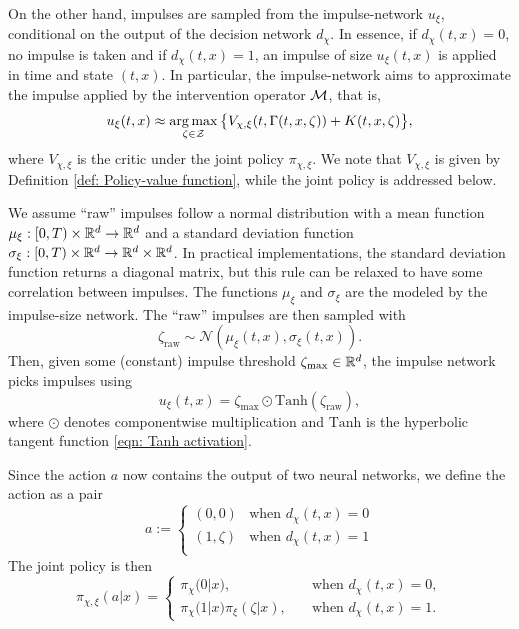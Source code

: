 On the other hand, impulses are sampled from the impulse-network $u_\xi$, conditional on the output of the decision network $d_\chi$. In essence, if $d_\chi(t,x) = 0$, no impulse is taken and if $d_\chi(t,x)=1$, an impulse of size $u_\xi(t,x)$ is applied in time and state $(t,x)$. In particular, the impulse-network aims to approximate the impulse applied by the intervention operator $\mathcal{M}$, that is, 
\begin{equation*}
    u_\xi(t,x) \approx \operatorname*{arg\,max}_{\zeta \in \mathcal{Z}} \big\{ V_{\chi, \xi}(t,\Gamma(t,x,\zeta)) + K(t,x,\zeta) \big\},
\end{equation*}
where $V_{\chi, \xi}$ is the critic under the joint policy $\pi_{\chi, \xi}$. We note that $V_{\chi, \xi}$ is given by Definition \ref{def: Policy-value function}, while the joint policy is addressed below. 

We assume ``raw'' impulses follow a normal distribution with a mean function $\mu_\xi: [0,T) \times \mathbb{R}^d \rightarrow \mathbb{R}^d$ and a standard deviation function $\sigma_\xi: [0,T) \times \mathbb{R}^d \rightarrow \mathbb{R}^d \times \mathbb{R}^d$. In practical implementations, the standard deviation function returns a diagonal matrix, but this rule can be relaxed to have some correlation between impulses. The functions $\mu_\xi$ and $\sigma_\xi$ are the modeled by the impulse-size network. The ``raw'' impulses are then sampled with 
\begin{equation*}
    \zeta_\text{raw} \sim \mathcal{N}(\mu_\xi(t,x), \sigma_\xi(t,x)).
\end{equation*}
Then, given some (constant) impulse threshold $\zeta_{\max} \in \mathbb{R}^d$, the impulse network picks impulses using
\begin{equation*}
    u_\xi(t,x) = \zeta_{\max} \odot \text{Tanh}(\zeta_\text{raw}),
\end{equation*}
where $\odot$ denotes componentwise multiplication and $\text{Tanh}$ is the hyperbolic tangent function \eqref{eqn: Tanh activation}. 

Since the action $a$ now contains the output of two neural networks, we define the action as a pair 
\begin{equation*}
    a := \begin{cases}
        (0,0) & \text{when } d_\chi(t,x) = 0 \\[1ex]
        (1,\zeta) & \text{when } d_\chi(t,x) = 1 \\
    \end{cases}
\end{equation*}
The joint policy is then
\begin{equation}
    \pi_{\chi, \xi}(a | x) = 
    \begin{cases}
        \pi_\chi \big(0| x\big), & \quad \text{when } d_\chi(t,x) = 0, \\[1ex]
        \pi_\chi \big(1|x \big) \pi_\xi(\zeta | x), & \quad \text{when } d_\chi(t,x) = 1.
    \end{cases}
    \label{eqn: PPO joint policy}
\end{equation}

